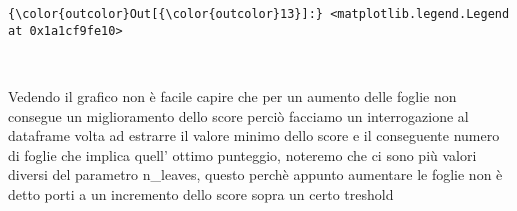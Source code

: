 \documentclass[11pt]{article}
\begin{document}
\begin{Verbatim}[commandchars=\\\{\}]
{\color{outcolor}Out[{\color{outcolor}13}]:} <matplotlib.legend.Legend at 0x1a1cf9fe10>
\end{Verbatim}
            
    \begin{center}
    \end{center}
    { \hspace*{\fill} \\}
    
    Vedendo il grafico non è facile capire che per un aumento delle foglie
non consegue un miglioramento dello score perciò facciamo un
interrogazione al dataframe volta ad estrarre il valore minimo dello
score e il conseguente numero di foglie che implica quell' ottimo
punteggio, noteremo che ci sono più valori diversi del parametro
n\_leaves, questo perchè appunto aumentare le foglie non è detto porti a
un incremento dello score sopra un certo treshold
\end{document}
